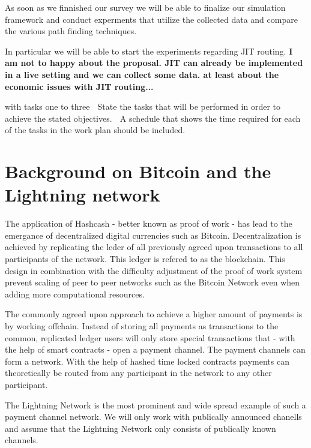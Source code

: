 \documentclass[a4paper]{paper}
\begin{document}
As soon as we finnished our survey we will be able to finalize our simulation framework and conduct experments that utilize the collected data and compare the various path finding techniques.

In particular we will be able to start the experiments regarding JIT routing. \textbf{I am not to happy about the proposal. JIT can already be implemented in a live setting and we can collect some data. at least about the economic issues with JIT routing...}

with tasks one to three
 State the tasks that will be performed in order to achieve the stated objectives.
 A schedule that shows the time required for each of the tasks in the work plan should be
included.




\appendix
\section{Background on Bitcoin and the Lightning network}
The application of Hashcash \cite{back2002hashcash} - better known as proof of work -  has lead to the emergance of decentralized digital currencies such as Bitcoin\cite{nakamoto2008bitcoin}.
Decentralization is achieved by replicating the leder of all previously agreed upon transactions to all participants of the network.
This ledger is refered to as the blockchain.
This design in combination with the difficulty adjustment of the proof of work system prevent scaling of peer to peer networks such as the Bitcoin Network even when adding more computational resources.

The commonly agreed upon approach to achieve a higher amount of payments is by working offchain.
Instead of storing all payments as transactions to the common, replicated ledger users will only store special transactions that - with the help of smart contracts - open a payment channel.
The payment channels can form a network.
With the help of hashed time locked contracts payments can theoretically be routed from any participant in the network to any other participant. 

The Lightning Network is the most prominent and wide spread example of such a payment channel network.
We will only work with publically announced chanells and assume that the Lightning Network only consists of publically known channels.
\end{document}
